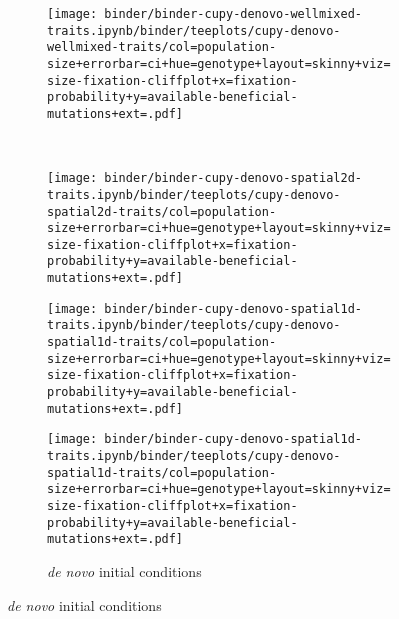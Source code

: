 \begin{figure}[h]
\begin{minipage}{\textwidth}
    \begin{subfigure}[b]{\linewidth}
        \begin{minipage}{0.3\textwidth}
          \texttt{[image: binder/binder-cupy-denovo-wellmixed-traits.ipynb/binder/teeplots/cupy-denovo-wellmixed-traits/col=population-size+errorbar=ci+hue=genotype+layout=skinny+viz=size-fixation-cliffplot+x=fixation-probability+y=available-beneficial-mutations+ext=.pdf]}%
        \end{minipage}%
        \begin{minipage}{0.06\textwidth}
          ~
        \end{minipage}%
        \begin{minipage}{0.26\textwidth}
          \texttt{[image: binder/binder-cupy-denovo-spatial2d-traits.ipynb/binder/teeplots/cupy-denovo-spatial2d-traits/col=population-size+errorbar=ci+hue=genotype+layout=skinny+viz=size-fixation-cliffplot+x=fixation-probability+y=available-beneficial-mutations+ext=.pdf]}%
        \end{minipage}%
        \begin{minipage}{0.25\textwidth}
          \texttt{[image: binder/binder-cupy-denovo-spatial1d-traits.ipynb/binder/teeplots/cupy-denovo-spatial1d-traits/col=population-size+errorbar=ci+hue=genotype+layout=skinny+viz=size-fixation-cliffplot+x=fixation-probability+y=available-beneficial-mutations+ext=.pdf]}%
        \end{minipage}%
      \begin{minipage}{0.12\textwidth}
        \raggedright
        \large
        \vspace{10ex}
        \caption{\textit{de novo} initial conditions}
        \label{fig:spatial-structure:denovo}

        \texttt{[image: binder/binder-cupy-denovo-spatial1d-traits.ipynb/binder/teeplots/cupy-denovo-spatial1d-traits/col=population-size+errorbar=ci+hue=genotype+layout=skinny+viz=size-fixation-cliffplot+x=fixation-probability+y=available-beneficial-mutations+ext=.pdf]}%
      \end{minipage}%
    \end{subfigure}%


\end{minipage}
\end{figure}
